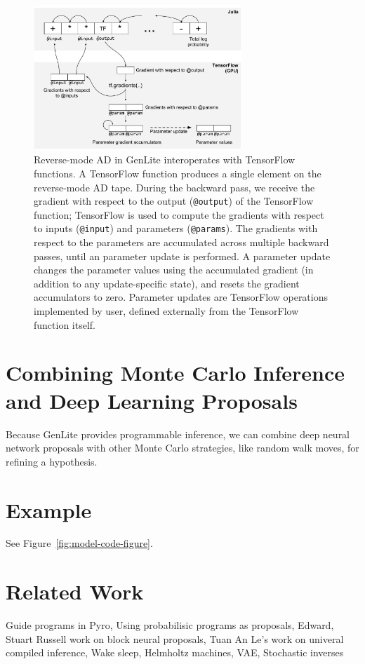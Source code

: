 \documentclass{article}
\begin{document}
\begin{figure}[h]
\centering
    \includegraphics[width=0.7\textwidth]{images/tf-integration-schematic.pdf}
    \caption{
Reverse-mode AD in GenLite interoperates with TensorFlow functions.
A TensorFlow function produces a single element on the reverse-mode AD tape.
During the backward pass, we receive the gradient with respect to the output (\texttt{@output}) of the TensorFlow function; TensorFlow is used to compute the gradients with respect to inputs (\texttt{@input}) and parameters (\texttt{@params}).
The gradients with respect to the parameters are accumulated across multiple backward passes, until an parameter update is performed.
A parameter update changes the parameter values using the accumulated gradient (in addition to any update-specific state), and resets the gradient accumulators to zero.
Parameter updates are TensorFlow operations implemented by user, defined externally from the TensorFlow function itself.
}
    \label{fig:tf-integration-schematic}
\end{figure}

\section{Combining Monte Carlo Inference and Deep Learning Proposals}
Because GenLite provides programmable inference, we can combine deep neural network proposals with other Monte Carlo strategies, like random walk moves, for refining a hypothesis.




\section{Example}
See Figure~\ref{fig:model-code-figure}.

\section{Related Work}
Guide programs in Pyro,
Using probabilisic programs as proposals,
Edward,
Stuart Russell work on block neural proposals,
Tuan An Le's work on univeral compiled inference,
Wake sleep,
Helmholtz machines,
VAE,
Stochastic inverses
\end{document}
